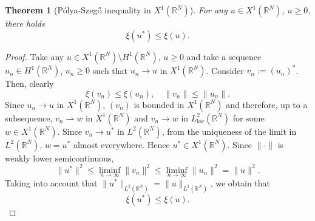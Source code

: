 \documentclass[12pt,leqno,twoside,sort]{amsart}
\newtheorem{Th}{Theorem}[section]
\newcommand{\R}{\mathbb{R}}
\newcommand{\weakto}{\rightharpoonup}
\numberwithin{equation}{section}
\begin{document}
\begin{Th}[Pólya-Szegő inequality in $X^1 (\R^N)$]
For any $u \in X^1 (\R^N)$, $u \geq 0$, there holds
$$
\xi(u^*) \leq \xi(u).
$$
\end{Th}

\begin{proof}
Take any $u \in X^1 (\R^N) \setminus H^1 (\R^N)$, $u \geq 0$ and take a sequence $u_n \in H^1 (\R^N)$, $u_n \geq 0$ such that $u_n \to u$ in $X^1 (\R^N)$. Consider $v_n := (u_n)^*$. Then, clearly
$$
\xi(v_n) \leq \xi(u_n), \quad \| v_n \| \leq \| u_n \|.
$$
Since $u_n \to u$ in $X^1(\R^N)$, $(v_n)$ is bounded in $X^1 (\R^N)$ and therefore, up to a subsequence, $v_n \weakto w$ in $X^1 (\R^N)$ and $v_n \to w$ in $L^2_{\mathrm{loc}}(\R^N)$ for some $w \in X^1 (\R^N)$. Since $v_n \to u^*$ in $L^2 (\R^N)$, from the uniqueness of the limit in $L^2 (\R^N)$, $w = u^*$ almost everywhere. Hence $u^* \in X^1 (\R^N)$. Since $\| \cdot \|$ is weakly lower semicontinuous,
$$
\| u^* \|^2 \leq \liminf_{n\to\infty} \|v_n\|^2 \leq \liminf_{n\to\infty} \|u_n\|^2 = \|u\|^2.  
$$
Taking into account that $\| u^* \|_{L^2 (\R^N)} = \| u \|_{L^2 (\R^N)}$, we obtain that
$$
\xi(u^*) \leq \xi(u).
$$
\end{proof}
\end{document}

